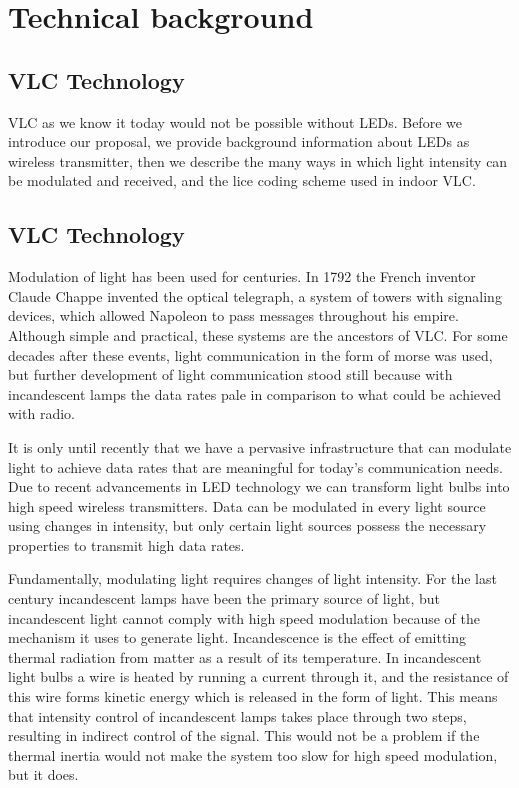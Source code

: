 \chapter{Technical background}
\label{Technical}


\section{VLC Technology}
VLC as we know it today would not be possible without LEDs. Before we introduce
our proposal, we provide background information
about LEDs as wireless transmitter, then we describe the many ways in which
light intensity can be modulated and received, and the lice coding scheme used
in indoor VLC.

\section{VLC Technology}

Modulation of light has been used for centuries. In 1792 the French inventor
Claude Chappe invented the optical telegraph, a system of towers with signaling
devices, which allowed Napoleon to pass messages throughout his empire. Although
simple and practical, these systems are the ancestors of VLC. For some decades
after these events, light communication in the form of morse was used, but further
development of light communication stood still because with incandescent lamps
the data rates pale in comparison to what could be achieved with radio.

It is only until recently that we have a pervasive infrastructure that can modulate
light to achieve data rates that are meaningful for today’s communication needs.
Due to recent advancements in LED technology we can transform light bulbs into
high speed wireless transmitters. Data can be modulated in every light source
using changes in intensity, but only certain light sources possess the necessary
properties to transmit high data rates.

Fundamentally, modulating light requires changes of light intensity. For the last
century incandescent lamps have been the primary source of light, but incandescent
light cannot comply with high speed modulation because of the mechanism
it uses to generate light. Incandescence is the effect of emitting thermal radiation
from matter as a result of its temperature. In incandescent light bulbs a wire is
heated by running a current through it, and the resistance of this wire forms kinetic 
energy which is released in the form of light. This means that intensity control
of incandescent lamps takes place through two steps, resulting in indirect control
of the signal. This would not be a problem if the thermal inertia would not make
the system too slow for high speed modulation, but it does.

